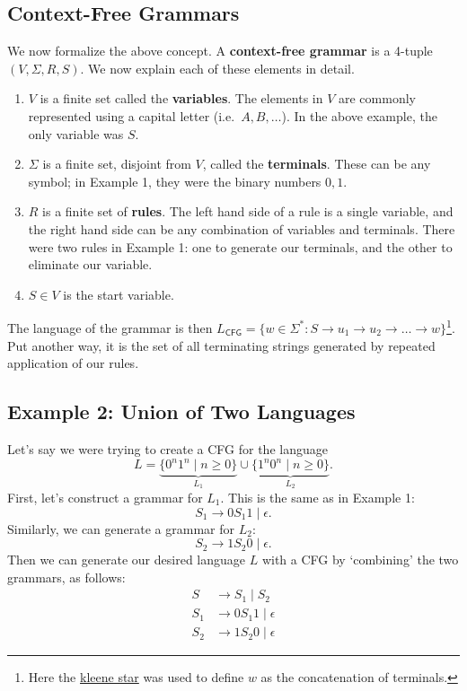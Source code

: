 \documentclass{article}
\begin{document}
\subsection*{Context-Free Grammars}
    We now formalize the above concept. A \textbf{context-free grammar} is a 4-tuple $(V, \Sigma, R, S)$. We now explain each of these elements in detail.
    \begin{enumerate}[label = \arabic*.]
        \item $V$ is a finite set called the \textbf{variables}. The elements in $V$ are commonly represented using a capital letter (i.e.\ $A, B, \dots$). In the above example, the only variable was $S$.
        \item $\Sigma$ is a finite set, disjoint from $V$, called the \textbf{terminals}. These can be any symbol; in Example 1, they were the binary numbers $0, 1$.
        \item $R$ is a finite set of \textbf{rules}. The left hand side of a rule is a single variable, and the right hand side can be any combination of variables and terminals. There were two rules in Example 1: one to generate our terminals, and the other to eliminate our variable.
        \item $S \in V$ is the start variable.
    \end{enumerate}
    The language of the grammar is then $L_{\textsf{CFG}} = \{w \in \Sigma^{*} : S \rightarrow u_{1} \rightarrow u_{2} \rightarrow \dots \rightarrow w\}$\footnote{Here the \href{https://en.wikipedia.org/wiki/Kleene_star}{kleene star} was used to define $w$ as the concatenation of terminals.}. Put another way, it is the set of all terminating strings generated by repeated application of our rules.

\subsection*{Example 2: Union of Two Languages}
    Let's say we were trying to create a CFG for the language $$L = \underbrace{\{0^{n}1^{n} \mid n \ge 0\}}_{L_{1}} \cup \underbrace{\{1^{n}0^{n} \mid n \ge 0\}}_{L_{2}}.$$ First, let's construct a grammar for $L_{1}$. This is the same as in Example 1: $$S_{1} \rightarrow 0S_{1}1 \mid \epsilon.$$ Similarly, we can generate a grammar for $L_{2}$: $$S_{2} \rightarrow 1S_{2}0 \mid \epsilon.$$ Then we can generate our desired language $L$ with a CFG by `combining' the two grammars, as follows:
    \begin{align*}
        S &\rightarrow S_{1} \mid S_{2} \\
        S_{1} &\rightarrow 0S_{1}1 \mid \epsilon \\
        S_{2} &\rightarrow 1S_{2}0 \mid \epsilon
    \end{align*}
\end{document}
